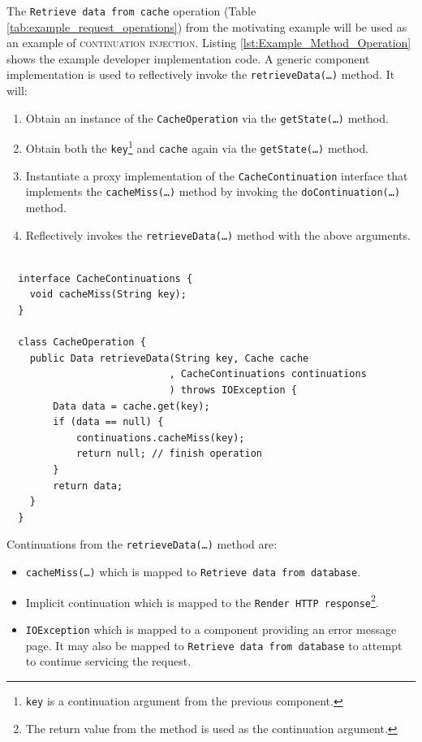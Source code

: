 \documentclass[prodmode]{style/acmlarge}
\begin{document}
The \texttt{Retrieve data from cache} operation (Table
\ref{tab:example_request_operations}) from the motivating example will be used
as an example of \textsc{continuation injection}.  Listing
\ref{lst:Example_Method_Operation} shows the example developer implementation
code.  A generic component implementation is used to reflectively invoke the
\texttt{retrieveData(\ldots)} method. It will:
\begin{enumerate}
  \item Obtain an instance of the \texttt{CacheOperation} via the \texttt{getState(\ldots)} method.
  \item Obtain both the \texttt{key}\footnote{\texttt{key} is a continuation argument from the previous component.} and \texttt{cache} again via the \texttt{getState(\ldots)} method.
  \item Instantiate a proxy implementation of the \texttt{CacheContinuation} interface that implements the \texttt{cacheMiss(\ldots)} method by invoking the \texttt{doContinuation(\ldots)} method. 
  \item Reflectively invokes the \texttt{retrieveData(\ldots)} method with the above arguments.
\end{enumerate}

\lstset{caption=Example developer implementation code for a component\protect\footnotemark}
\begin{lstlisting}[float,label=lst:Example_Method_Operation]

  interface CacheContinuations {
    void cacheMiss(String key);
  }

  class CacheOperation {    
    public Data retrieveData(String key, Cache cache
                            , CacheContinuations continuations
                            ) throws IOException {
        Data data = cache.get(key);
        if (data == null) {
            continuations.cacheMiss(key);
            return null; // finish operation
        }
        return data;
    }
  }
\end{lstlisting}

Continuations from the \texttt{retrieveData(\ldots)} method are:
\begin{itemize}
  \item \texttt{cacheMiss(\ldots)} which is mapped to \texttt{Retrieve data from database}.
  \item Implicit continuation which is mapped to the \texttt{Render HTTP response}\footnote{The return value from the method is used as the continuation argument.}.
  \item \texttt{IOException} which is mapped to a component providing an error message page.  It may also be mapped to \texttt{Retrieve data from database} to attempt to continue servicing the request.
\end{itemize}
\end{document}
